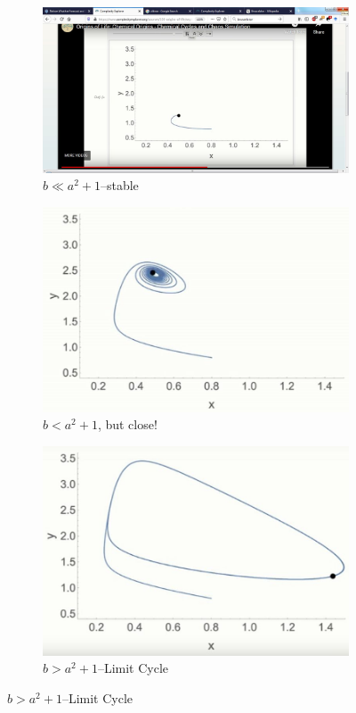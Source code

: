 \documentclass[]{article}
\begin{document}
{\begin{figure}[H]
\begin{subfigure}[b]{0.3\textwidth}
	\end{subfigure}
	\begin{subfigure}[b]{0.3\textwidth}
		\centering
		\caption{ $b\ll a^2+1$--stable}\label{fig:BrusselatorPhase1} 
		\includegraphics[width=\textwidth]{BrusselatorPhase1}
	\end{subfigure}
	\begin{subfigure}[b]{0.3\textwidth}
		\centering
		\caption{$b<a^2+1$, but close!}\label{fig:BrusselatorPhase2} 
		\includegraphics[width=\textwidth]{BrusselatorPhase2}
	\end{subfigure}
	\begin{subfigure}[b]{0.3\textwidth}
		\centering
		\caption{$b>a^2+1$--Limit Cycle}\label{fig:BrusselatorPhase3} 
		\includegraphics[width=\textwidth]{BrusselatorPhase3}
	\end{subfigure}
\end{figure}

}
\end{document}
